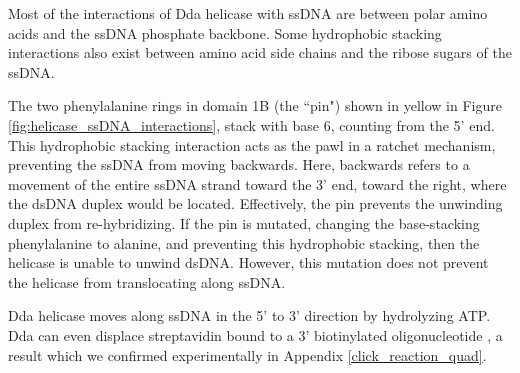 Most of the interactions of Dda helicase with ssDNA are between polar amino acids and the ssDNA phosphate backbone.  Some hydrophobic stacking interactions also exist between amino acid side chains and the ribose sugars of the ssDNA. \citep{He2012}

The two phenylalanine rings in domain 1B (the ``pin") shown in yellow in Figure \ref{fig:helicase_ssDNA_interactions}, stack with base 6, counting from the 5' end.  This hydrophobic stacking interaction acts as the pawl in a ratchet mechanism, preventing the ssDNA from moving backwards.  Here, backwards refers to a movement of the entire ssDNA strand toward the 3' end, toward the right, where the dsDNA duplex would be located.  Effectively, the pin prevents the unwinding duplex from re-hybridizing.  If the pin is mutated, changing the base-stacking phenylalanine to alanine, and preventing this hydrophobic stacking, then the helicase is unable to unwind dsDNA.  However, this mutation does not prevent the helicase from translocating along ssDNA. \citep{He2012}

Dda helicase moves along ssDNA in the 5' to 3' direction by hydrolyzing ATP.  Dda can even displace streptavidin bound to a 3' biotinylated oligonucleotide \citep{Morris1999}, a result which we confirmed experimentally in Appendix \ref{click_reaction_quad}.


